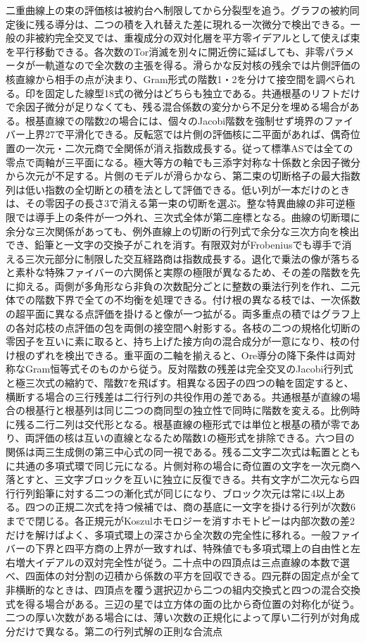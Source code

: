 \documentclass[11pt,a4paper]{ltjsarticle}
\begin{document}
二重曲線上の束の評価核は被約台へ制限してから分裂型を追う。グラフの被約同定後に残る導分は、二つの積を入れ替えた差に現れる一次微分で検出できる。一般の非被約完全交叉では、重複成分の双対化層を平方零イデアルとして使えば束を平行移動できる。各次数のTor消滅を別々に開近傍に延ばしても、非零パラメータが一軌道なので全次数の主張を得る。滑らかな反対核の残余では片側評価の核直線から相手の点が決まり、Gram形式の階数1・2を分けて接空間を調べられる。印を固定した線型18式の微分はどちらも独立である。共通根基のリフトだけで余因子微分が足りなくても、残る混合係数の変分から不足分を埋める場合がある。根基直線での階数2の場合には、個々のJacobi階数を強制せず境界のファイバー上界27で平滑化できる。反転窓では片側の評価核に二平面があれば、偶奇位置の一次元・二次元商で全関係が消え指数成長する。従って標準ASでは全ての零点で両軸が三平面になる。極大等方の軸でも三添字対称な十係数と余因子微分から次元が不足する。片側のモデルが滑らかなら、第二束の切断格子の最大指数列は低い指数の全切断との積を法として評価できる。低い列が一本だけのときは、その零因子の長さ3で消える第一束の切断を選ぶ。整な特異曲線の非可逆極限では導手上の条件が一つ外れ、三次式全体が第二座標となる。曲線の切断環に余分な三次関係があっても、例外直線上の切断の行列式で余分な三次方向を検出でき、鉛筆と一文字の交換子がこれを消す。有限双対がFrobeniusでも導手で消える三次元部分に制限した交互経路商は指数成長する。退化で乗法の像が落ちると素朴な特殊ファイバーの六関係と実際の極限が異なるため、その差の階数を先に抑える。両側が多角形なら非負の次数配分ごとに整数の乗法行列を作れ、二元体での階数下界で全ての不均衡を処理できる。付け根の異なる枝では、一次係数の超平面に異なる点評価を掛けると像が一つ拡がる。両多重点の積ではグラフ上の各対応枝の点評価の包を両側の接空間へ射影する。各枝の二つの規格化切断の零因子を互いに素に取ると、持ち上げた接方向の混合成分が一意になり、枝の付け根のずれを検出できる。重平面の二軸を揃えると、Ore導分の降下条件は両対称なGram恒等式そのものから従う。反対階数の残差は完全交叉のJacobi行列式と極三次式の縮約で、階数7を飛ばす。相異なる因子の四つの軸を固定すると、横断する場合の三行残差は二行行列の共役作用の差である。共通根基が直線の場合の根基行と根基列は同じ二つの商同型の独立性で同時に階数を変える。比例時に残る二行二列は交代形となる。根基直線の極形式では単位と根基の積が零であり、両評価の核は互いの直線となるため階数1の極形式を排除できる。六つ目の関係は両三生成側の第三中心式の同一視である。残る二文字二次式は転置とともに共通の多項式環で同じ元になる。片側対称の場合に奇位置の文字を一次元商へ落とすと、三文字ブロックを互いに独立に反復できる。共有文字が二次元なら四行行列鉛筆に対する二つの漸化式が同じになり、ブロック次元は常に4以上ある。四つの正規二次式を持つ候補では、商の基底に一文字を掛ける行列が次数6までで閉じる。各正規元がKoszulホモロジーを消すホモトピーは内部次数の差2だけを解けばよく、多項式環上の深さから全次数の完全性に移れる。一般ファイバーの下界と四平方商の上界が一致すれば、特殊値でも多項式環上の自由性と左右増大イデアルの双対完全性が従う。二十点中の四頂点は三点直線の本数で選べ、四面体の対分割の辺積から係数の平方を回収できる。四元群の固定点が全て非横断的なときは、四頂点を覆う選択辺から二つの組内交換式と四つの混合交換式を得る場合がある。三辺の星では立方体の面の比から奇位置の対称化が従う。二つの厚い次数がある場合には、薄い次数の正規化によって厚い二行列が対角成分だけで異なる。第二の行列式解の正則な合流点
\end{document}

